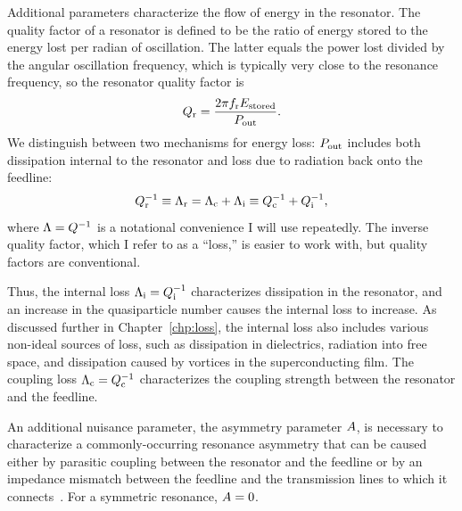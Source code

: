 Additional parameters characterize the flow of energy in the resonator.
The quality factor of a resonator is defined to be the ratio of energy stored to the energy lost per radian of oscillation.
The latter equals the power lost divided by the angular oscillation frequency, which is typically very close to the resonance frequency, so the resonator quality factor is
\begin{equation}
Q_{\mathrm{r}}
  =
  \frac{2 \pi f_{\mathrm{r}} E_\mathrm{stored}}{P_\mathrm{out}}.
\end{equation}
We distinguish between two mechanisms for energy loss: $P_\mathrm{out}$ includes both dissipation internal to the resonator and loss due to radiation back onto the feedline:
\begin{equation}
Q_{\mathrm{r}}^{-1}
  \equiv
  \Lambda_{\mathrm{r}}
  =
  \Lambda_{\mathrm{c}} + \Lambda_{\mathrm{i}}
  \equiv
  Q_{\mathrm{c}}^{-1} + Q_{\mathrm{i}}^{-1},
\end{equation}
where $\Lambda = Q^{-1}$ is a notational convenience I will use repeatedly.
The inverse quality factor, which I refer to as a ``loss,'' is easier to work with, but quality factors are conventional.

Thus, the internal loss $\Lambda_{\mathrm{i}} = Q_{\mathrm{i}}^{-1}$ characterizes dissipation in the resonator, and an increase in the quasiparticle number causes the internal loss to increase.
As discussed further in Chapter~\ref{chp:loss}, the internal loss also includes various non-ideal sources of loss, such as dissipation in dielectrics, radiation into free space, and dissipation caused by vortices in the superconducting film.
The coupling loss $\Lambda_{\mathrm{c}} = Q_{\mathrm{c}}^{-1}$ characterizes the coupling strength between the resonator and the feedline.

An additional nuisance parameter, the asymmetry parameter $A$, is necessary to characterize a commonly-occurring resonance asymmetry that can be caused either by parasitic coupling between the resonator and the feedline or by an impedance mismatch between the feedline and the transmission lines to which it connects~\autocite{Khalil2012JAP}.
For a symmetric resonance, $A = 0$.


